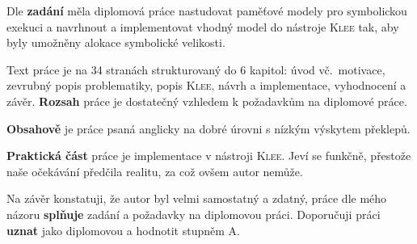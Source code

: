 




Dle \textbf{zadání} měla diplomová práce nastudovat paměťové modely pro
symbolickou exekuci a navrhnout a implementovat vhodný model do nástroje
\textsc{Klee} tak, aby byly umožněny alokace symbolické velikosti.

Text práce je na 34 stranách strukturovaný do 6 kapitol: úvod vč.\
motivace, zevrubný popis problematiky, popis \textsc{Klee}, návrh a
implementace, vyhodnocení a závěr. \textbf{Rozsah} práce je dostatečný vzhledem
k požadavkům na diplomové práce.

\textbf{Obsahově} je práce psaná anglicky na dobré úrovni s nízkým výskytem
překlepů.

\textbf{Praktická část} práce je implementace v nástroji \textsc{Klee}.  Jeví
se funkčně, přestože naše očekávání předčila realitu, za což ovšem autor
nemůže.

Na závěr konstatuji, že autor byl velmi samostatný a zdatný, práce dle mého
názoru \textbf{splňuje} zadání a požadavky na diplomovou práci.  Doporučuji
práci \textbf{uznat} jako diplomovou a hodnotit stupněm A.

\botinfo

